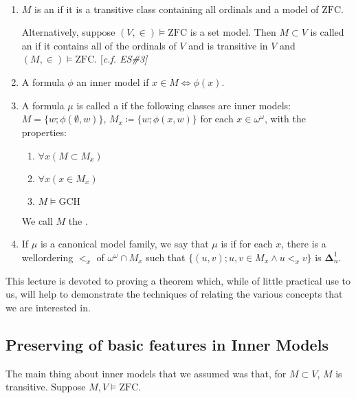 \documentclass[]{article}
\newcommand{\om}{\omega}
\newcommand{\bodel}{\bm{\Delta}}
\newcommand{\zfc}{\textrm{ZFC}}
\begin{document}
\begin{defin*}\ 
    \begin{enumerate}
        \item $M$ is an  if it is a transitive class containing all ordinals and a model of $\zfc$.
        
        Alternatively, suppose $(V,\in)\models \zfc$ is a set model. Then $M\subset V$ is called an  if it contains all of the ordinals of $V$ and is transitive in $V$ and $(M,\in)\models \zfc$. [\it{c.f.} ES\#3]

        \item A formula $\phi$  an inner model if $x \in M \iff \phi(x)$.
        
        \item A formula $\mu$ is called a  if the following classes are inner models: $M = \{w;\phi(\emptyset,w)\}$, $M_x \coloneqq \{w;\phi(x,w)\}$ for each $x \in \om^\om$, with the properties:
        \begin{enumerate}[label = (\alph*)]
            \item $\forall x (M\subset M_x)$
            \item $\forall x (x \in M_x)$
            \item $M\models \textrm{GCH}$
        \end{enumerate}

        We call $M$ the .

        \item If $\mu$ is a canonical model family, we say that $\mu$ is \undf{$\bodel^1_n$-wellordered} if for each $x$, there is a wellordering $<_x$ of $\om^\om \cap M_x$ such that $\{(u,v); u,v\in M_x \land u <_x v\}$ is $\bodel^1_n$.
    \end{enumerate}
\end{defin*}


This lecture is devoted to proving a theorem which, while of little practical use to us, will help to demonstrate the techniques of relating the various concepts that we are interested in.

\subsection*{Preserving of basic features in Inner Models}

The main thing about inner models that we assumed was that, for $M\subset V$, $M$ is transitive. Suppose $M,V\models \zfc$.
\end{document}
